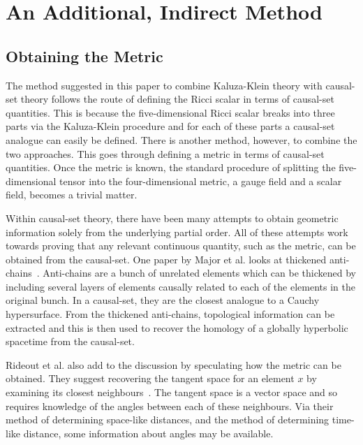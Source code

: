 \documentclass[a4paper,12pt]{article}
\numberwithin{equation}{section}
\begin{document}
\newpage

\label{sec:Bibliography}
\renewcommand{\refname}{Bibliography}



\newpage

\appendix

\section{An Additional, Indirect Method}
\label{sec:An Additional, Indirect Method}
\subsection{Obtaining the Metric}
\label{sec:Obtaining the Metric}

The method suggested in this paper to combine Kaluza-Klein theory with causal-set theory follows the route of defining the Ricci scalar in terms of causal-set quantities. This is because the five-dimensional Ricci scalar breaks into three parts via the Kaluza-Klein procedure and for each of these parts a causal-set analogue can easily be defined. There is another method, however, to combine the two approaches. This goes through defining a metric in terms of causal-set quantities. Once the metric is known, the standard procedure of splitting the five-dimensional tensor into the four-dimensional metric, a gauge field and a scalar field, becomes a trivial matter.

Within causal-set theory, there have been many attempts to obtain geometric information solely from the underlying partial order. All of these attempts work towards proving that any relevant continuous quantity, such as the metric, can be obtained from the causal-set. One paper by Major et al. looks at thickened anti-chains~\cite{Major2007}. Anti-chains are a bunch of unrelated elements which can be thickened by including several layers of elements causally related to each of the elements in the original bunch. In a causal-set, they are the closest analogue to a Cauchy hypersurface. From the thickened anti-chains, topological information can be extracted and this is then used to recover the homology of a globally hyperbolic spacetime from the causal-set.

Rideout et al. also add to the discussion by speculating how the metric can be obtained. They suggest recovering the tangent space for an element $x$ by examining its closest neighbours~\cite{Rideout2009}. The tangent space is a vector space and so requires knowledge of the angles between each of these neighbours. Via their method of determining space-like distances, and the method of determining time-like distance, some information about angles may be available.
\end{document}
